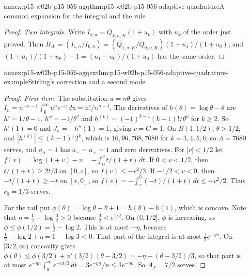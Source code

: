 \begin{annexitem}{annex:p15-w02b-p15-056-agq}{thm:p15-w02b-p15-056-adaptive-quadrature}{A common expansion for the integral and the rule}
\begin{proof}
\emph{Two integrals.} Write \(I_{k,n}=Q_{k,n,K}(1+u_k)\) with \(u_k\) of
the order just proved. Then
\(B_{10}=(I_{1,n}/I_{0,n})=(Q_{1,n,K}/Q_{0,n,K})(1+u_1)/(1+u_0)\), and
\((1+u_1)/(1+u_0)-1=(u_1-u_0)/(1+u_0)\) has the same order.
\end{proof}
\end{annexitem}

\begin{annexitem}{annex:p15-w02b-p15-056-agqex}{thm:p15-w02b-p15-056-adaptive-quadrature-example}{Stirling's correction and a second mode}
\begin{proof}
\emph{First item.} The substitution \(u=n\theta\) gives
\(I_n=n^{-n-1}\int_0^\infty u^ne^{-u}\,du=n!/n^{n+1}\). The derivatives
of \(h(\theta)=\log\theta-\theta\) are \(h'=1/\theta-1\),
\(h''=-1/\theta^2\) and \(h^{(k)}=(-1)^{k-1}(k-1)!/\theta^k\) for
\(k\geq2\). So \(h'(1)=0\) and \(J_n=-h''(1)=1\), giving \(c=C=1\). On
\(B(1,1/2)\), \(\theta>1/2\), and \(|h^{(k)}|\leq(k-1)!\,2^k\), which is
\(16,96,768,7680\) for \(k=3,4,5,6\); so \(A=7680\) serves, and
\(a_n=1\) has \(a_-=a_+=1\) and zero derivatives. For \(|v|<1/2\) let
\(f(v)=\log(1+v)-v=-\int_0^vt/(1+t)\,dt\). If \(0<v<1/2\), then
\(t/(1+t)\geq2t/3\) on \([0,v]\), so \(f(v)\leq-v^2/3\). If
\(-1/2<v<0\), then \(-t/(1+t)\geq-t\) on \([v,0]\), so
\(f(v)=-\int_v^0(-t)/(1+t)\,dt\leq-v^2/2\). Thus \(c_0=1/3\) serves.

For the tail put \(\phi(\theta)=\log\theta-\theta+1=h(\theta)-h(1)\),
which is concave. Note that \(\eta=\tfrac12-\log\tfrac32>0\) because
\(\tfrac32<e^{1/2}\). On \((0,1/2]\), \(\phi\) is increasing, so
\(\phi\leq\phi(1/2)=\tfrac12-\log2\). This is at most \(-\eta\), because
\(\tfrac12-\log2+\eta=1-\log3<0\). That part of the integral is at most
\(\tfrac12e^{-\eta n}\). On \([3/2,\infty)\) concavity gives
\(\phi(\theta)\leq\phi(3/2)+\phi'(3/2)(\theta-3/2)
=-\eta-(\theta-3/2)/3\), so that part is at most
\(e^{-\eta n}\int_0^\infty e^{-nt/3}\,dt=3e^{-\eta n}/n\leq3e^{-\eta n}\).
So \(A_T=7/2\) serves.


\end{proof}
\end{annexitem}
